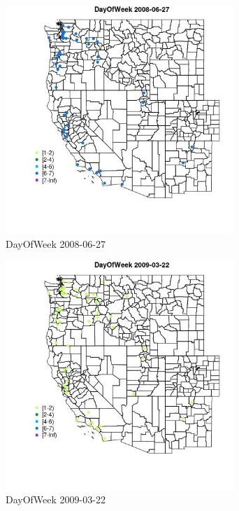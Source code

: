 \begin{figure} 
\centering  
\includegraphics[width=0.77\textwidth]{Code_Outputs/Report_ML_input_PM25_Step4_part_e_de_duplicated_aves_MapObsDayOfWeek2008-06-27.jpg} 
\caption{\label{fig:Report_ML_input_PM25_Step4_part_e_de_duplicated_avesMapObsDayOfWeek2008-06-27}DayOfWeek 2008-06-27} 
\end{figure} 
 

\begin{figure} 
\centering  
\includegraphics[width=0.77\textwidth]{Code_Outputs/Report_ML_input_PM25_Step4_part_e_de_duplicated_aves_MapObsDayOfWeek2009-03-22.jpg} 
\caption{\label{fig:Report_ML_input_PM25_Step4_part_e_de_duplicated_avesMapObsDayOfWeek2009-03-22}DayOfWeek 2009-03-22} 
\end{figure} 
 

